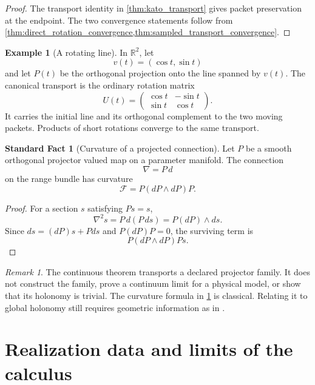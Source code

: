 \documentclass{aomart}
\theoremstyle{definition}
\newtheorem{example}[example]{Example}
\newtheorem{standardfact}[standardfact]{Standard Fact}
\theoremstyle{remark}
\newtheorem{remark}[remark]{Remark}
\newcommand{\Fcal}{\mathcal F}
\begin{document}
\begin{proof}
The transport identity in \cref{thm:kato_transport} gives packet preservation at the endpoint.  The two convergence statements follow from \cref{thm:direct_rotation_convergence,thm:sampled_transport_convergence}.
\end{proof}

\begin{example}[A rotating line]\label{ex:rotating_line}
In $\mathbb R^2$, let
\[
v(t)=(\cos t,\sin t)
\]
and let $P(t)$ be the orthogonal projection onto the line spanned by $v(t)$.  The canonical transport is the ordinary rotation matrix
\[
U(t)=
\begin{pmatrix}
\cos t&-\sin t\\
\sin t&\cos t
\end{pmatrix}.
\]
It carries the initial line and its orthogonal complement to the two moving packets.  Products of short rotations converge to the same transport.
\end{example}


\begin{standardfact}[Curvature of a projected connection]\label{fact:projected_curvature}
Let $P$ be a smooth orthogonal projector valued map on a parameter manifold.  The connection
\[
\nabla=P\,d
\]
on the range bundle has curvature
\[
\Fcal=P(dP\wedge dP)P.
\]
\end{standardfact}

\begin{proof}
For a section $s$ satisfying $Ps=s$,
\[
\nabla^2s=P\,d(P\,ds)=P(dP)\wedge ds.
\]
Since $ds=(dP)s+Pds$ and $P(dP)P=0$, the surviving term is
\[
P(dP\wedge dP)Ps.
\]
\end{proof}

\begin{remark}\label{rem:continuous_boundary}
The continuous theorem transports a declared projector family.  It does not construct the family, prove a continuum limit for a physical model, or show that its holonomy is trivial.  The curvature formula in \cref{fact:projected_curvature} is classical.  Relating it to global holonomy still requires geometric information as in \cite{Kato1950,Kato1995,KobayashiNomizu1963}.
\end{remark}

\section{Realization data and limits of the calculus}\label{sec:scope}
\end{document}
